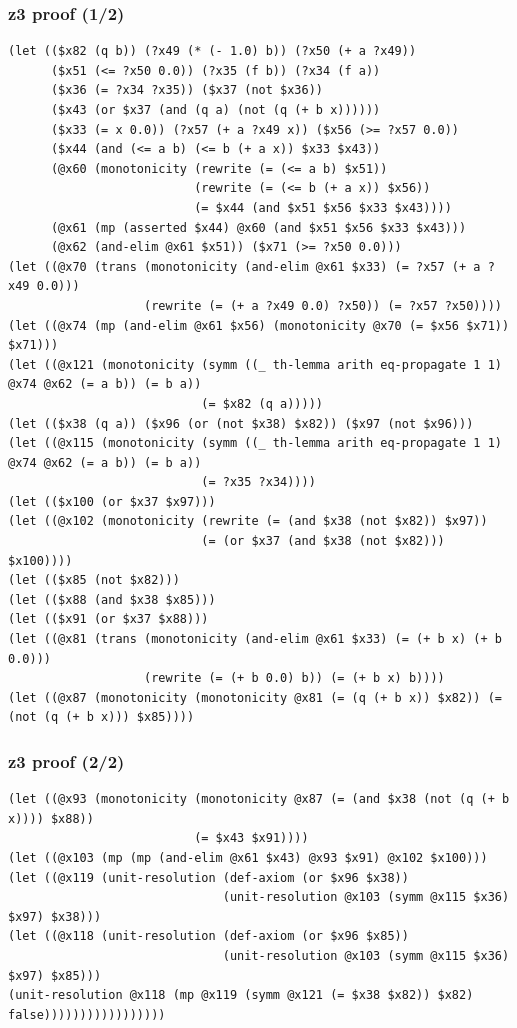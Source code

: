 \documentclass[svgnames,table,mathserif]{beamer}
\begin{document}
\begin{frame}[fragile]
\frametitle{z3 proof (1/2)}

{\tiny
\begin{verbatim}
(let (($x82 (q b)) (?x49 (* (- 1.0) b)) (?x50 (+ a ?x49))
      ($x51 (<= ?x50 0.0)) (?x35 (f b)) (?x34 (f a))
      ($x36 (= ?x34 ?x35)) ($x37 (not $x36))
      ($x43 (or $x37 (and (q a) (not (q (+ b x))))))
      ($x33 (= x 0.0)) (?x57 (+ a ?x49 x)) ($x56 (>= ?x57 0.0))
      ($x44 (and (<= a b) (<= b (+ a x)) $x33 $x43))
      (@x60 (monotonicity (rewrite (= (<= a b) $x51))
                          (rewrite (= (<= b (+ a x)) $x56))
                          (= $x44 (and $x51 $x56 $x33 $x43))))
      (@x61 (mp (asserted $x44) @x60 (and $x51 $x56 $x33 $x43)))
      (@x62 (and-elim @x61 $x51)) ($x71 (>= ?x50 0.0)))
(let ((@x70 (trans (monotonicity (and-elim @x61 $x33) (= ?x57 (+ a ?x49 0.0)))
                   (rewrite (= (+ a ?x49 0.0) ?x50)) (= ?x57 ?x50))))
(let ((@x74 (mp (and-elim @x61 $x56) (monotonicity @x70 (= $x56 $x71)) $x71)))
(let ((@x121 (monotonicity (symm ((_ th-lemma arith eq-propagate 1 1) @x74 @x62 (= a b)) (= b a))
                           (= $x82 (q a)))))
(let (($x38 (q a)) ($x96 (or (not $x38) $x82)) ($x97 (not $x96)))
(let ((@x115 (monotonicity (symm ((_ th-lemma arith eq-propagate 1 1) @x74 @x62 (= a b)) (= b a))
                           (= ?x35 ?x34))))
(let (($x100 (or $x37 $x97)))
(let ((@x102 (monotonicity (rewrite (= (and $x38 (not $x82)) $x97))
                           (= (or $x37 (and $x38 (not $x82))) $x100))))
(let (($x85 (not $x82)))
(let (($x88 (and $x38 $x85)))
(let (($x91 (or $x37 $x88)))
(let ((@x81 (trans (monotonicity (and-elim @x61 $x33) (= (+ b x) (+ b 0.0)))
                   (rewrite (= (+ b 0.0) b)) (= (+ b x) b))))
(let ((@x87 (monotonicity (monotonicity @x81 (= (q (+ b x)) $x82)) (= (not (q (+ b x))) $x85))))
\end{verbatim}
}

\end{frame}

\begin{frame}[fragile]
\frametitle{z3 proof (2/2)}

{\tiny
\begin{verbatim}
(let ((@x93 (monotonicity (monotonicity @x87 (= (and $x38 (not (q (+ b x)))) $x88))
                          (= $x43 $x91))))
(let ((@x103 (mp (mp (and-elim @x61 $x43) @x93 $x91) @x102 $x100)))
(let ((@x119 (unit-resolution (def-axiom (or $x96 $x38))
                              (unit-resolution @x103 (symm @x115 $x36) $x97) $x38)))
(let ((@x118 (unit-resolution (def-axiom (or $x96 $x85))
                              (unit-resolution @x103 (symm @x115 $x36) $x97) $x85)))
(unit-resolution @x118 (mp @x119 (symm @x121 (= $x38 $x82)) $x82) false)))))))))))))))))
\end{verbatim}
}

\end{frame}
\end{document}
